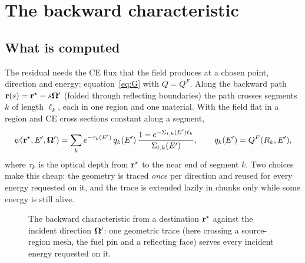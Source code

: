 \section{The backward characteristic}\label{sec:backward}

\subsection{What is computed}

The residual needs the CE flux that the field produces at a chosen point, direction and energy:
equation~\eqref{eq:G} with $Q=Q^F$. Along the backward path $\mathbf r(s)=\mathbf r^\star-s\boldsymbol\Omega'$ (folded through
reflecting boundaries) the path crosses segments $k$ of length $\ell_k$, each in one region and one
material. With the field flat in a region and CE cross sections constant along a segment,
\begin{equation}\label{eq:psi}
\psi(\mathbf r^\star,E',\boldsymbol\Omega')=\sum_k e^{-\tau_k(E')}\,q_k(E')\,
\frac{1-e^{-\Sigma_{t,k}(E')\ell_k}}{\Sigma_{t,k}(E')},\qquad q_k(E')=Q^F(R_k,E'),
\end{equation}
where $\tau_k$ is the optical depth from $\mathbf r^\star$ to the near end of segment $k$. Two choices make
this cheap: the geometry is traced \emph{once} per direction and reused for every energy requested
on it, and the trace is extended lazily in chunks only while some energy is still alive.

\begin{figure}[t]\centering
{}
\caption{The backward characteristic from a destination $\mathbf r^\star$ against the incident direction
$\boldsymbol\Omega'$: one geometric trace (here crossing a source-region mesh, the fuel pin and a reflecting face)
serves every incident energy requested on it.}\label{fig:backward}
\end{figure}

